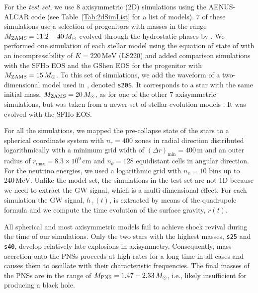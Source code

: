  
{For the {\it test set}, we use $8$ axisymmetric (2D) simulations using the AENUS-ALCAR code
(see Table~\ref{Tab:2dSimList} for a list of models).
$7$ of these simulations use a selection of progenitors with masses in the range} $M_{\mathrm{ZAMS}} = 11.2 - 40 \, M_{\odot}$
 evolved through the hydrostatic phases by
\cite{Woosley_Heger_Weaver__2002__ReviewsofModernPhysics__The_evolution_and_explosion_of_massive_stars}.
We performed one simulation of each stellar model using the equation
of state of \cite{Lattimer_Swesty__1991__NuclearPhysicsA__LS-EOS} with
an incompressibility of $K = 220 \, \mathrm{MeV}$ (LS220) and added
comparison simulations with the SFHo EOS
\cite{Steiner_et_al__2013__apj__Core-collapseSupernovaEquationsofStateBasedonNeutronStarObservations}
and the GShen EOS 
\cite{Shen_et_al__2011__prc__Newequationofstateforastrophysicalsimulations}
for the {progenitor} with $M_{\mathrm{ZAMS}} = 15 \, M_{\odot}$. To this set of
simulations, we add the waveform of a two-dimensional model used in
\cite{Torres:2019a}, denoted \texttt{s20S}. It corresponds to a star
with the same initial mass, $M_{\mathrm{ZAMS}} = 20 \, M_{\odot}$, as for
one of the other 7 axisymmetric simulations, but was taken from a
newer set of stellar-evolution models
\cite{Woosley_Heger__2007__physrep__Nucleosynthesisandremnantsinmassivestarsofsolarmetallicity}.
It was evolved with the SFHo EOS.


{For all the simulations,} we mapped the pre-collapse state of the stars to a spherical
coordinate system with $n_r = 400$ zones in radial direction
distributed logarithmically with a minimum grid width of
$(\Delta r)_{\mathrm{min}} = 400 \, \mathrm{m}$ and an outer radius of
$r_{\mathrm{max}} = 8.3 \times 10^{9} \, \mathrm{cm}$ and
$n_{\theta} = 128$ equidistant cells in angular direction. For the
neutrino energies, we used a logarithmic grid with $n_e = 10$ bins up
to $240 \, \mathrm{MeV}$.
{Unlike the model set, the simulations in the test set are not 1D because we need to 
extract the GW signal, which is a multi-dimensional effect. For each simulation
the GW signal, $h_+(t)$, is extracted by means of the quadrupole formula and we compute the 
time evolution of the surface gravity, $r(t)$.}

All spherical and most axisymmetric models fail to achieve shock
revival during the time of our simulations. Only the two stars with
the highest masses, \texttt{s25} and \texttt{s40}, develop relatively
late explosions in axisymmetry. Consequently, mass accretion onto the
PNSs proceeds at high rates for a long time in all cases and causes
them to oscillate with their characteristic frequencies. The final
masses of the PNSs are in the range of
$M_{\mathrm{PNS}} = 1.47 - 2.33 \, M_{\odot}$, i.e., likely insufficient for
producing a black hole.


 	

